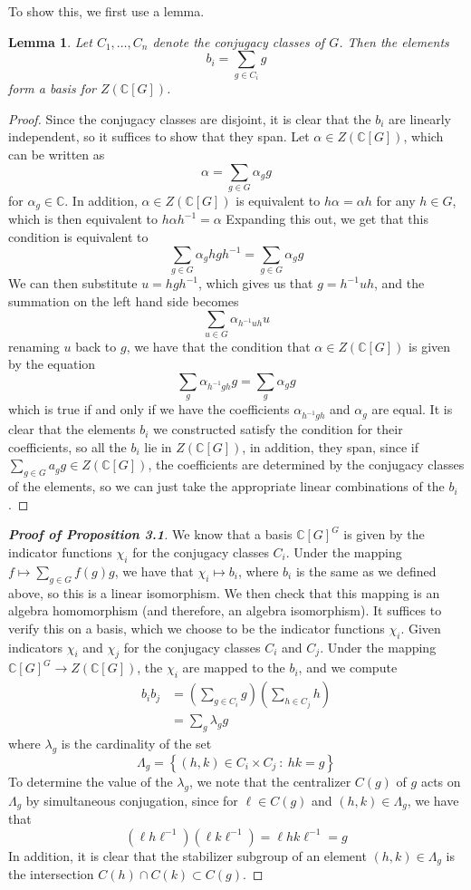 \documentclass[psamsfonts, 11pt]{amsart}
\newtheorem{lem}[thm]{Lemma}
\theoremstyle{definition}
\theoremstyle{remark}
\newcommand{\ib}[1]{\textbf{\textit{#1}}}
\newcommand{\C}{\mathbb{C}}
\newcommand{\inv}{^{-1}}
\newcommand{\set}[1]{\left\lbrace #1 \right\rbrace}
\begin{document}
%
To show this, we first use a lemma.
%
\begin{lem}
Let $C_1, \ldots, C_n$ denote the conjugacy classes of $G$. Then the elements
\[
b_i = \sum_{g \in C_i} g
\]
form a basis for $Z(\C[G])$.
\end{lem}
%
\begin{proof}
Since the conjugacy classes are disjoint, it is clear that the $b_i$ are linearly
independent, so it suffices to show that they span. Let $\alpha \in Z(\C[G])$, which
can be written as
\[
\alpha = \sum_{g \in G} \alpha_g g
\]
for $\alpha_g \in \C$. In addition, $\alpha \in Z(\C[G])$ is equivalent to
$h\alpha = \alpha h$ for any  $h \in G$, which is then equivalent to
$h\alpha h\inv = \alpha$ Expanding this out, we get that this condition
is equivalent to
\[
\sum_{g \in G} \alpha_g hgh\inv = \sum_{g \in G}\alpha_g g
\]
We can then substitute $u = hgh\inv$, which gives us that $g = h\inv u h$, and the
summation on the left hand side becomes
\[
\sum_{u \in G}\alpha_{h\inv uh} u
\]
renaming $u$ back to $g$, we have that the condition that $\alpha \in Z(\C[G])$ is
given by the equation
\[
\sum_g \alpha_{h\inv gh}g = \sum_g \alpha_g g
\]
which is true if and only if we have the coefficients $\alpha_{h\inv gh}$ and $\alpha_g$
are equal. It is clear that the elements $b_i$ we constructed satisfy the condition
for their coefficients, so all the $b_i$ lie in $Z(\C[G])$, in addition, they span,
since if $\sum_{g \in G} a_g g \in Z(\C[G])$, the coefficients are determined by the
conjugacy classes of the elements, so we can just take the appropriate linear
combinations of the $b_i$.
\end{proof}
%
\begin{proof}[\ib{Proof of Proposition 3.1}]
We know that a basis $\C[G]^G$ is given by the indicator functions $\chi_i$ for the
conjugacy classes $C_i$. Under the mapping $f \mapsto \sum_{g \in G} f(g)g$, we have that
$\chi_i \mapsto b_i$, where $b_i$ is the same as we defined above, so this is
a linear isomorphism. We then check that this mapping is an algebra homomorphism
(and therefore, an algebra isomorphism). It suffices to verify this on a basis, which
we choose to be the indicator functions $\chi_i$. Given indicators $\chi_i$ and $\chi_j$
for the conjugacy classes $C_i$ and $C_j$. Under the mapping $\C[G]^G \to Z(\C[G])$,
the $\chi_i$ are mapped to the $b_i$, and we compute
%
\begin{align*}
b_ib_j &= \left( \sum_{g \in C_i} g \right)\left( \sum_{h \in C_j} h \right) \\
&= \sum_{g} \lambda_g g
\end{align*}
where $\lambda_g$ is the cardinality of the set
\[
\Lambda_g = \set{(h,k) \in C_i \times C_j ~:~ hk = g}
\]
To determine the value of the $\lambda_g$, we note that the centralizer $C(g)$ of $g$
acts on $\Lambda_g$ by simultaneous conjugation, since for $\ell \in C(g)$ and
$(h,k) \in \Lambda_g$, we have that
\[
(\ell h \ell\inv)(\ell k \ell \inv) = \ell hk \ell\inv = g
\]
In addition, it is clear that the stabilizer subgroup of an element $(h,k) \in \Lambda_g$
is the intersection $C(h) \cap C(k) \subset C(g)$.
%
\end{proof}
%
\end{document}
